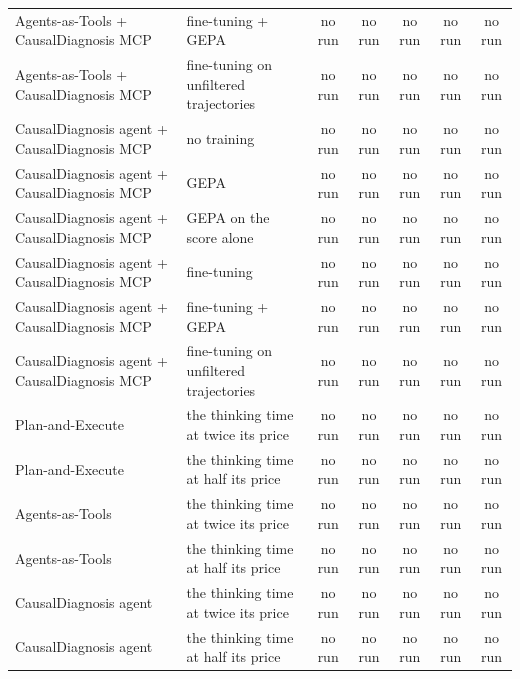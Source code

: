 \documentclass[10pt]{article}
\begin{document}
\begin{table}[H]
\begin{tabular}{llccccc}
Agents-as-Tools + CausalDiagnosis MCP & fine-tuning + GEPA & no run & no run & no run & no run & no run \\
Agents-as-Tools + CausalDiagnosis MCP & fine-tuning on unfiltered trajectories & no run & no run & no run & no run & no run \\
CausalDiagnosis agent + CausalDiagnosis MCP & no training & no run & no run & no run & no run & no run \\
CausalDiagnosis agent + CausalDiagnosis MCP & GEPA & no run & no run & no run & no run & no run \\
CausalDiagnosis agent + CausalDiagnosis MCP & GEPA on the score alone & no run & no run & no run & no run & no run \\
CausalDiagnosis agent + CausalDiagnosis MCP & fine-tuning & no run & no run & no run & no run & no run \\
CausalDiagnosis agent + CausalDiagnosis MCP & fine-tuning + GEPA & no run & no run & no run & no run & no run \\
CausalDiagnosis agent + CausalDiagnosis MCP & fine-tuning on unfiltered trajectories & no run & no run & no run & no run & no run \\
\midrule
Plan-and-Execute & the thinking time at twice its price & no run & no run & no run & no run & no run \\
Plan-and-Execute & the thinking time at half its price & no run & no run & no run & no run & no run \\
Agents-as-Tools & the thinking time at twice its price & no run & no run & no run & no run & no run \\
Agents-as-Tools & the thinking time at half its price & no run & no run & no run & no run & no run \\
CausalDiagnosis agent & the thinking time at twice its price & no run & no run & no run & no run & no run \\
CausalDiagnosis agent & the thinking time at half its price & no run & no run & no run & no run & no run \\
\bottomrule
\end{tabular}
\end{table}
\vspace{-8pt}
\end{document}
